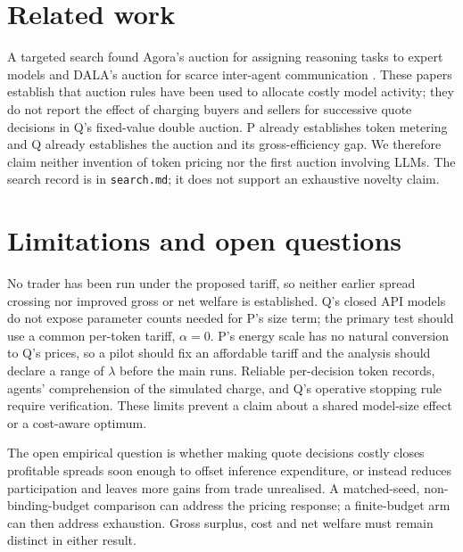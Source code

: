 \documentclass{article}
\begin{document}
\section{Related work}
A targeted search found Agora's auction for assigning reasoning tasks to expert models \cite{zhou2026agora} and DALA's auction for scarce inter-agent communication \cite{fan2025communication}. These papers establish that auction rules have been used to allocate costly model activity; they do not report the effect of charging buyers and sellers for successive quote decisions in Q's fixed-value double auction. P already establishes token metering and Q already establishes the auction and its gross-efficiency gap. We therefore claim neither invention of token pricing nor the first auction involving LLMs. The search record is in \texttt{search.md}; it does not support an exhaustive novelty claim. %

\clearpage
\section{Limitations and open questions}
No trader has been run under the proposed tariff, so neither earlier spread crossing nor improved gross or net welfare is established. Q's closed API models do not expose parameter counts needed for P's size term; the primary test should use a common per-token tariff, \(\alpha=0\). P's energy scale has no natural conversion to Q's prices, so a pilot should fix an affordable tariff and the analysis should declare a range of \(\lambda\) before the main runs. Reliable per-decision token records, agents' comprehension of the simulated charge, and Q's operative stopping rule require verification. These limits prevent a claim about a shared model-size effect or a cost-aware optimum. %

The open empirical question is whether making quote decisions costly closes profitable spreads soon enough to offset inference expenditure, or instead reduces participation and leaves more gains from trade unrealised. A matched-seed, non-binding-budget comparison can address the pricing response; a finite-budget arm can then address exhaustion. Gross surplus, cost and net welfare must remain distinct in either result. %
\end{document}
